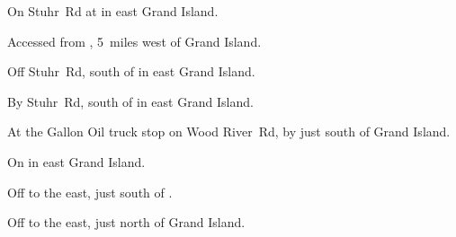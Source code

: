 
\begin{LocationList}

On Stuhr~Rd at  in east Grand Island.

Accessed from , 5~miles west of Grand Island.

Off Stuhr~Rd, south of  in east Grand Island.

By Stuhr~Rd, south of  in east Grand Island.

At the Gallon Oil truck stop on Wood River~Rd, by  just south of Grand Island.

\Location{\GarageHQ \Garage}
On  in east Grand Island.

Off  to the east, just south of .

Off  to the east, just north of Grand Island.

\end{LocationList}
